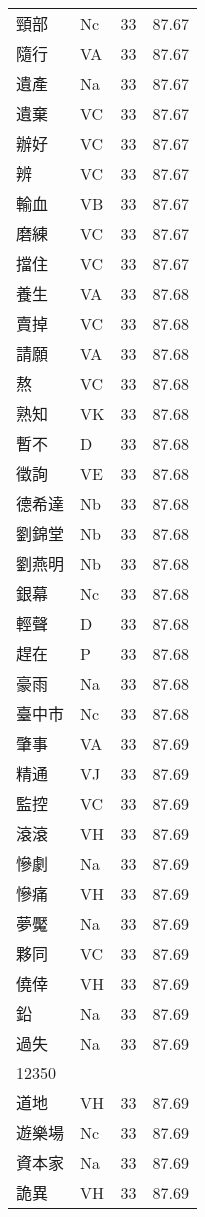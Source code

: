 \documentclass[twocolumn]{book}
\begin{document}
\begin{supertabular}{llrr}
頸部 & Nc & 33 &  87.67\\
隨行 & VA & 33 &  87.67\\
遺產 & Na & 33 &  87.67\\
遺棄 & VC & 33 &  87.67\\
辦好 & VC & 33 &  87.67\\
辨 & VC & 33 &  87.67\\
輸血 & VB & 33 &  87.67\\
磨練 & VC & 33 &  87.67\\
擋住 & VC & 33 &  87.67\\
養生 & VA & 33 &  87.68\\
賣掉 & VC & 33 &  87.68\\
請願 & VA & 33 &  87.68\\
熬 & VC & 33 &  87.68\\
熟知 & VK & 33 &  87.68\\
暫不 & D & 33 &  87.68\\
徵詢 & VE & 33 &  87.68\\
德希達 & Nb & 33 &  87.68\\
劉錦堂 & Nb & 33 &  87.68\\
劉燕明 & Nb & 33 &  87.68\\
銀幕 & Nc & 33 &  87.68\\
輕聲 & D & 33 &  87.68\\
趕在 & P & 33 &  87.68\\
豪雨 & Na & 33 &  87.68\\
臺中市 & Nc & 33 &  87.68\\
肇事 & VA & 33 &  87.69\\
精通 & VJ & 33 &  87.69\\
監控 & VC & 33 &  87.69\\
滾滾 & VH & 33 &  87.69\\
慘劇 & Na & 33 &  87.69\\
慘痛 & VH & 33 &  87.69\\
夢魘 & Na & 33 &  87.69\\
夥同 & VC & 33 &  87.69\\
僥倖 & VH & 33 &  87.69\\
鉛 & Na & 33 &  87.69\\
過失 & Na & 33 &  87.69\\
12350\\
道地 & VH & 33 &  87.69\\
遊樂場 & Nc & 33 &  87.69\\
資本家 & Na & 33 &  87.69\\
詭異 & VH & 33 &  87.69\\

\end{supertabular}
\end{document}
